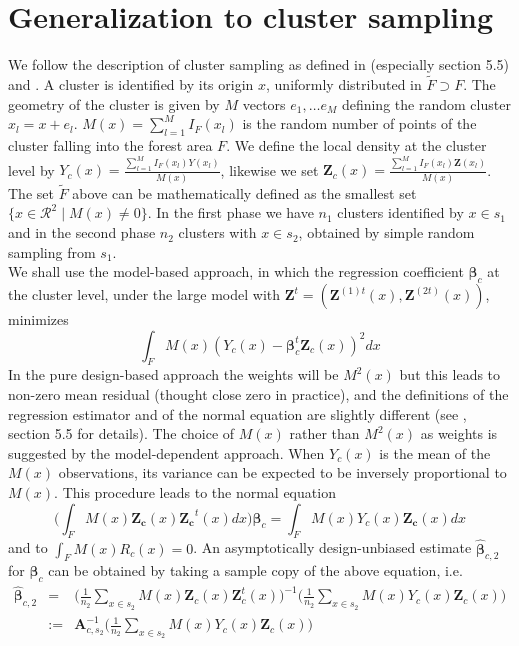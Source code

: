 \documentclass[a4paper,12pt,leqno, titlepage]{article}
\begin{document}
{{\section{Generalization to cluster sampling}
We follow the description of cluster sampling as defined in \cite{mandallaz} (especially section 5.5) and \cite{mandallazreport1}. A cluster is identified by its origin $x$, uniformly distributed in $\tilde{F}\supset F$. The geometry of the cluster is given by $M$ vectors $e_1,\ldots e_M$ defining the random cluster $x_l=x+e_l$. $M(x)=\sum_{l=1}^MI_{F}(x_l)$ is the random number of points of the cluster falling into the forest area $F$. We define the local density at the cluster level by $Y_c(x)=\frac{\sum_{l=1}^MI_{F}(x_l)Y(x_l)}{M(x)}$, likewise we set $\pmb{Z}_c(x)=\frac{\sum_{l=1}^MI_{F}(x_l)\pmb{Z}(x_l)}{M(x)}$. The set $\tilde{F}$ above can be mathematically defined as the smallest set $\{x\in{\mathcal{R}}^2 \mid M(x) \ne 0 \}$. In the first phase we have $n_1$ clusters identified by $x\in{s_1}$ and in the second phase $n_2$ clusters with $x\in{s_2}$, obtained by simple random sampling from $s_1$.\\
We shall use the model-based approach, in which the regression coefficient $\pmb{\beta}_c$ at the cluster level, under the large model with $\pmb{Z}^t=(\pmb{Z}^{(1)t}(x), \pmb{Z}^{(2t)}(x))$,  minimizes
$$\int_F M(x)(Y_c(x)-\pmb{\beta}_c^{t}\pmb{Z}_c(x))^2dx$$
In the pure design-based approach the weights will be $M^2(x)$ but this leads to non-zero mean residual (thought close zero in practice), and the definitions of the regression estimator and of the normal equation are slightly different (see \cite{mandallaz}, section 5.5 for details). The choice of $M(x)$ rather than $M^2(x)$ as weights is suggested by the model-dependent approach. When $Y_c(x)$ is the mean of the
$M(x)$ observations, its variance can be expected to be inversely
proportional to $M(x)$.  This procedure  leads to the normal equation
$$\Big(\int_F M(x)\pmb{Z_c}(x)\pmb{Z_c}^t(x)dx\Big)\pmb{\beta}_c=\int_F M(x)Y_c(x)\pmb{Z_c}(x)dx$$
and to $\int_F M(x)R_c(x)=0$. An asymptotically design-unbiased estimate $\hat{\pmb{\beta}}_{c,2}$  for $\pmb{\beta}_c$ can be obtained  by taking a sample copy of the above equation, i.e.
 \begin{eqnarray}\label{estbetacluster1}
 \hat{\pmb{\beta}}_{c,2}&=&
 \Big(\frac{1}{n_2}\sum_{x\in{s_2}}M(x)\pmb{Z}_c(x)\pmb{Z}_c^t(x)\Big)^{-1}
 \Big(\frac{1}{n_2}\sum_{x\in{s_2}}M(x)Y_c(x)\pmb{Z}_c(x)\Big)
 \nonumber\\
 &:=&\pmb{A}^{-1}_{c,s_2}\Big(\frac{1}{n_2}\sum_{x\in{s_2}}M(x)Y_c(x)\pmb{Z}_c(x)\Big)

\end{eqnarray}}}
\end{document}
